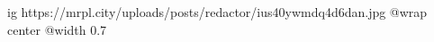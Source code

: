  
 
 
 
 

\ifcmt
  ig https://mrpl.city/uploads/posts/redactor/ius40ywmdq4d6dan.jpg
  @wrap center
  @width 0.7
\fi
